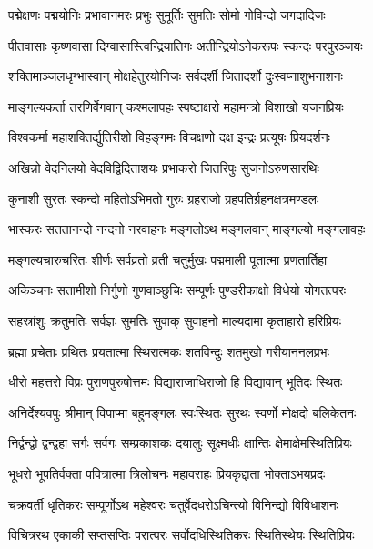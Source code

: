 \twolineshloka
{पद्मेक्षणः पद्मयोनिः प्रभावानमरः प्रभुः}
{सुमूर्तिः सुमतिः सोमो गोविन्दो जगदादिजः}%

\twolineshloka
{पीतवासाः कृष्णवासा दिग्वासास्त्विन्द्रियातिगः}
{अतीन्द्रियोऽनेकरूपः स्कन्दः परपुरञ्जयः}%

\twolineshloka
{शक्तिमाञ्जलधृग्भास्वान् मोक्षहेतुरयोनिजः}
{सर्वदर्शी  जितादर्शो दुःस्वप्नाशुभनाशनः}%

\twolineshloka
{माङ्गल्यकर्ता तरणिर्वेगवान् कश्मलापहः}
{स्पष्टाक्षरो महामन्त्रो विशाखो यजनप्रियः}%

\twolineshloka
{विश्वकर्मा महाशक्तिर्द्युतिरीशो विहङ्गमः}
{विचक्षणो दक्ष इन्द्रः प्रत्यूषः प्रियदर्शनः}%

\twolineshloka
{अखिन्नो वेदनिलयो वेदविद्विदिताशयः}
{प्रभाकरो जितरिपुः सुजनोऽरुणसारथिः}%

\twolineshloka
{कुनाशी सुरतः स्कन्दो महितोऽभिमतो गुरुः}
{ग्रहराजो ग्रहपतिर्ग्रहनक्षत्रमण्डलः}%

\twolineshloka
{भास्करः सततानन्दो नन्दनो नरवाहनः}
{मङ्गलोऽथ मङ्गलवान् माङ्गल्यो मङ्गलावहः}%

\twolineshloka
{मङ्गल्यचारुचरितः शीर्णः सर्वव्रतो व्रती}
{चतुर्मुखः पद्ममाली पूतात्मा प्रणतार्तिहा}%

\twolineshloka
{अकिञ्चनः सतामीशो निर्गुणो गुणवाञ्छुचिः}
{सम्पूर्णः पुण्डरीकाक्षो विधेयो योगतत्परः}%

\twolineshloka
{सहस्रांशुः क्रतुमतिः सर्वज्ञः सुमतिः सुवाक्}
{सुवाहनो माल्यदामा कृताहारो हरिप्रियः}%

\twolineshloka
{ब्रह्मा प्रचेताः प्रथितः प्रयतात्मा स्थिरात्मकः}
{शतविन्दुः शतमुखो गरीयाननलप्रभः}%

\twolineshloka
{धीरो महत्तरो विप्रः पुराणपुरुषोत्तमः}
{विद्याराजाधिराजो हि विद्यावान् भूतिदः स्थितः}%

\twolineshloka
{अनिर्देश्यवपुः श्रीमान् विपाप्मा बहुमङ्गलः}
{स्वःस्थितः सुरथः स्वर्णो मोक्षदो बलिकेतनः}%

\twolineshloka
{निर्द्वन्द्वो द्वन्द्वहा सर्गः सर्वगः सम्प्रकाशकः}
{दयालुः सूक्ष्मधीः क्षान्तिः क्षेमाक्षेमस्थितिप्रियः}%

\twolineshloka
{भूधरो भूपतिर्वक्ता पवित्रात्मा त्रिलोचनः}
{महावराहः प्रियकृद्दाता भोक्ताऽभयप्रदः}%

\twolineshloka
{चक्रवर्ती धृतिकरः सम्पूर्णोऽथ महेश्वरः}
{चतुर्वेदधरोऽचिन्त्यो विनिन्द्यो विविधाशनः}%

\twolineshloka
{विचित्ररथ एकाकी सप्तसप्तिः परात्परः}
{सर्वोदधिस्थितिकरः स्थितिस्थेयः स्थितिप्रियः}%

